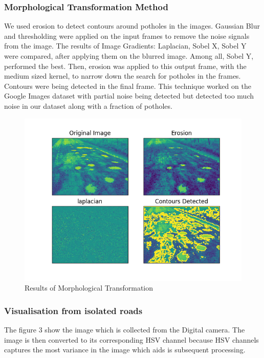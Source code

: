 \documentclass[journal]{IEEEtran}
\begin{document}
\subsubsection{Morphological Transformation Method}
We used erosion to detect contours around potholes in the images. Gaussian Blur and thresholding were applied on the input frames to remove the noise signals from the image. The results of Image Gradients: Laplacian, Sobel X, Sobel Y were compared, after applying them on the blurred image. Among all, Sobel Y, performed the best. Then, erosion was applied to this output frame, with the medium sized kernel, to narrow down the search for potholes in the frames. Contours were being detected in the final frame. This technique worked on the Google Images dataset with partial noise being detected but detected too much noise in our dataset along with a fraction of potholes.

\begin{figure}[!htb]
\begin{center}
\includegraphics[scale=0.65]{Images/morph_transform_2.png}
\end{center}
\caption{Results of Morphological Transformation}
\end{figure}

\newpage

\subsubsection{Visualisation from isolated roads}

\noindent The figure 3 show the image which is collected from the Digital camera. The image is then converted to its corresponding HSV channel because HSV channels captures the most variance in the image which aids is subsequent processing.  
\end{document}
